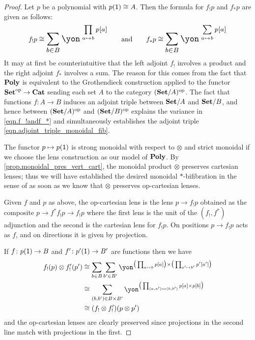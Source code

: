 \documentclass[Book-Poly]{subfiles}
\begin{document}
\begin{proof}
Let $p$ be a polynomial with $p(\textsf{1})\cong A$. Then the formula for $f_!p$ and $f_*p$ are given as follows:
\begin{equation}\label{eqn.f_!andf_*}
f_!p\cong\scalebox{1.3}{$\displaystyle\sum_{b\in B}\yon^{\;\prod\limits_{a\mapsto b}p[a]}$}
\qqand
f_*p\cong\scalebox{1.3}{$\displaystyle\sum_{b\in B}\yon^{\;\sum\limits_{a\mapsto b}p[a]}$}
\end{equation}
It may at first be counterintuitive that the left adjoint $f_!$ involves a product and the right adjoint $f_*$ involves a sum. The reason for this comes from the fact that $\mathbf{Poly}$ is equivalent to the Grothendieck construction applied to the functor $\mathbf{Set}^{\textnormal{op}}\to\mathbf{Cat}$ sending each set $A$ to the category $(\mathbf{Set}/A)^{\textnormal{op}}$. The fact that functions $f\colon A\to B$ induces an adjoint triple between $\mathbf{Set}/A$ and $\mathbf{Set}/B$, and hence between $(\mathbf{Set}/A)^{\textnormal{op}}$ and $(\mathbf{Set}/B)^{\textnormal{op}}$ explains the variance in \eqref{eqn.f_!andf_*} and simultaneously establishes the adjoint triple \eqref{eqn.adjoint_triple_monoidal_fib}.

The functor $p\mapsto p(\textsf{1})$ is strong monoidal with respect to $\otimes$ and strict monoidal if we choose the lens construction as our model of $\mathbf{Poly}$. By \cref{prop.monoidal_pres_vert_cart}, the monoidal product $\otimes$ preserves cartesian lenses; thus we will have established the desired monoidal $*$-bifibration in the sense of \cite[Definition 12.1]{shulman2008framed} as soon as we know that $\otimes$ preserves op-cartesian lenses.

Given $f$ and $p$ as above, the op-cartesian lens is the lens $p\to f_!p$ obtained as the composite $p\to f^*f_!p\to f_!p$ where the first lens is the unit of the $(f_!,f^*)$ adjunction and the second is the cartesian lens for $f_!p$. On positions $p\to f_!p$ acts as $f$, and on directions it is given by projection.

If $f\colon p(\textsf{1})\to B$ and $f'\colon p'(\textsf{1})\to B'$ are functions then we have
\begin{align*}
	f_!(p)\otimes f'_!(p')&\cong
	\sum_{b\in B}\sum_{b'\in B'}\yon^{\big(\prod_{a\mapsto b}p[a]\big)\times\big(\prod_{a'\mapsto b'}p'[a']\big)}\\&\cong
	\sum_{(b,b')\in B\times B'}\yon^{\big(\prod_{(a,a')\mapsto(b,b')}p[a]\times p[b]\big)}\\&
	\cong (f_!\otimes f'_!)(p\otimes p')
\end{align*}
and the op-cartesian lenses are clearly preserved since projections in the second line match with projections in the first.
\end{proof}
\end{document}
